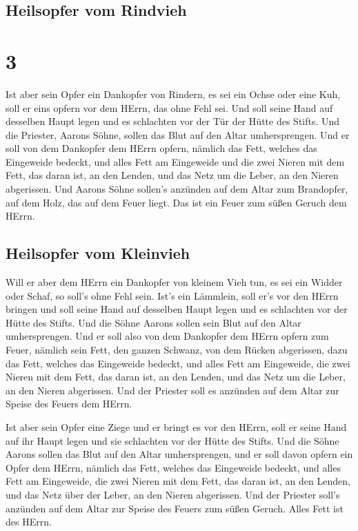 \hypertarget{heilsopfer-vom-rindvieh}{%
\subsection{Heilsopfer vom Rindvieh}\label{heilsopfer-vom-rindvieh}}

\hypertarget{section-2}{%
\section{3}\label{section-2}}

 Ist aber sein Opfer ein Dankopfer von Rindern, es sei ein
Ochse oder eine Kuh, soll er eins opfern vor dem HErrn, das ohne Fehl
sei.  Und soll seine Hand auf desselben Haupt legen und es
schlachten vor der Tür der Hütte des Stifts. Und die Priester, Aarons
Söhne, sollen das Blut auf den Altar umhersprengen.  Und
er soll von dem Dankopfer dem HErrn opfern, nämlich das Fett, welches
das Eingeweide bedeckt, und alles Fett am Eingeweide  und
die zwei Nieren mit dem Fett, das daran ist, an den Lenden, und das Netz
um die Leber, an den Nieren abgerissen.  Und Aarons Söhne
sollen's anzünden auf dem Altar zum Brandopfer, auf dem Holz, das auf
dem Feuer liegt. Das ist ein Feuer zum süßen Geruch dem HErrn.

\hypertarget{heilsopfer-vom-kleinvieh}{%
\subsection{Heilsopfer vom Kleinvieh}\label{heilsopfer-vom-kleinvieh}}

 Will er aber dem HErrn ein Dankopfer von kleinem Vieh
tun, es sei ein Widder oder Schaf, so soll's ohne Fehl sein.
 Ist's ein Lämmlein, soll er's vor den HErrn bringen
 und soll seine Hand auf desselben Haupt legen und es
schlachten vor der Hütte des Stifts. Und die Söhne Aarons sollen sein
Blut auf den Altar umhersprengen.  Und er soll also von
dem Dankopfer dem HErrn opfern zum Feuer, nämlich sein Fett, den ganzen
Schwanz, von dem Rücken abgerissen, dazu das Fett, welches das
Eingeweide bedeckt, und alles Fett am Eingeweide,  die
zwei Nieren mit dem Fett, das daran ist, an den Lenden, und das Netz um
die Leber, an den Nieren abgerissen.  Und der Priester
soll es anzünden auf dem Altar zur Speise des Feuers dem HErrn.

 Ist aber sein Opfer eine Ziege und er bringt es vor den
HErrn,  soll er seine Hand auf ihr Haupt legen und sie
schlachten vor der Hütte des Stifts. Und die Söhne Aarons sollen das
Blut auf den Altar umhersprengen,  und er soll davon
opfern ein Opfer dem HErrn, nämlich das Fett, welches das Eingeweide
bedeckt, und alles Fett am Eingeweide,  die zwei Nieren
mit dem Fett, das daran ist, an den Lenden, und das Netz über der Leber,
an den Nieren abgerissen.  Und der Priester soll's
anzünden auf dem Altar zur Speise des Feuers zum süßen Geruch. Alles
Fett ist des HErrn.

